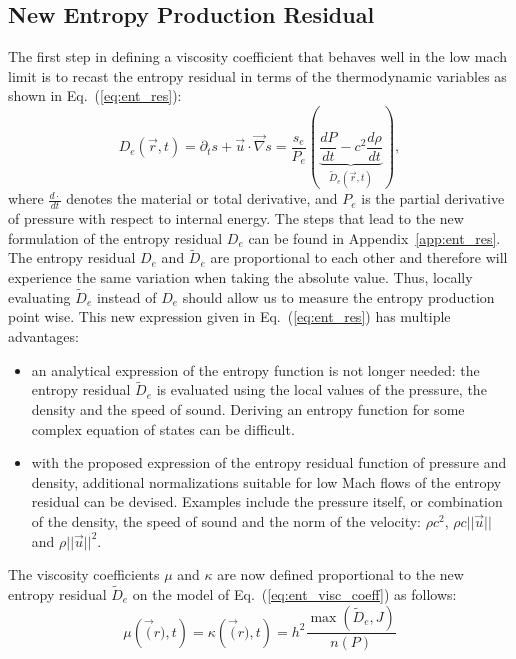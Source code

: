 \documentclass[preprint,10pt]{elsarticle}
\newcommand{\grad}{\vec{\nabla}}
\newcommand{\eqt}[1]{Eq.~(\ref{#1})}                     %
\newcommand{\app}[1]{Appendix~\ref{#1}}                   %
\begin{document}
\subsection{New Entropy Production Residual} 
The first step in defining a viscosity coefficient that behaves well in the low mach limit is to recast the entropy residual in terms of the thermodynamic variables as shown in \eqt{eq:ent_res}:
\begin{equation}
\label{eq:ent_res}
D_e(\vec{r},t) = \partial_t s + \vec{u} \cdot \grad s = \frac{s_e}{P_e} \left( \underbrace{\frac{d P}{dt} - c^2 \frac{d \rho}{dt}}_{\tilde{D}_e(\vec{r},t)} \right),
\end{equation} 
where $\frac{d \cdot}{dt}$ denotes the material or total derivative, and $P_e$ is the partial derivative of pressure with respect to internal energy. The steps that lead to the new formulation of the entropy residual $D_e$ can be found in \app{app:ent_res}. \\
The entropy residual $D_e$ and $\tilde{D}_e$ are proportional to each other and therefore will experience the same variation when taking the absolute value. Thus,  locally evaluating $\tilde{D}_e$ instead of $D_e$ should allow us to measure the entropy production point wise. This new expression given in \eqt{eq:ent_res} has multiple advantages:
\begin{itemize}
\item an analytical expression of the entropy function is not longer needed: the entropy residual $\tilde{D}_e$ is evaluated using the local values of the pressure, the density and the speed of sound. Deriving an entropy function for some complex equation of states can be difficult.
\item with the proposed expression of the entropy residual function of pressure and density, additional normalizations suitable for low Mach flows of the entropy residual can be devised. Examples include the pressure itself, or combination of the density, the speed of sound and the norm of the velocity: $\rho c^2$, $\rho c || \vec{u} ||$ and $\rho || \vec{u} ||^2$. 
\end{itemize}
The viscosity coefficients $\mu$ and $\kappa$ are now defined proportional to the new entropy residual $\tilde{D}_e$ on the model of \eqt{eq:ent_visc_coeff} as follows:
\begin{equation}\label{eq:norm_param}
\mu \left( \vec(r),t \right) = \kappa \left( \vec(r),t \right) = h^2 \frac{\max \left( \tilde{D}_e, J \right)}{n(P)}
\end{equation}
\end{document}
